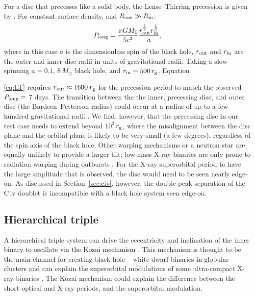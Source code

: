 \documentclass[a4paper,fleqn,usenatbib]{mnras}
\begin{document}
For a disc that precesses like a solid body, the Lense--Thirring precession is given by \citet[their Equation 43]{2007ApJ...668..417F}. For constant surface density, and $R_{\rm out} \gg R_{\rm in}$:
\begin{equation}
\label{eq:LT}
P_{\rm long} = \frac{\pi G M_1}{5 c^3} \frac{r_{\rm out}^{\frac{5}{2}} r_{\rm in}^{\frac{1}{2}}}{a},
\end{equation}
where in this case $a$ is the dimensionless spin of the black hole, $r_{\rm out}$ and $r_{\rm in}$ are the outer and inner disc radii in units of gravitational radii. Taking a slow-spinning $a=0.1$, $8\,M_\odot$ black hole, and $r_{\rm in} = 500\,r_{\rm g}$, Equation~{\ref{eq:LT} requires $r_{\rm out} \approx 1600$\,$r_{\rm g}$ for the precession period to match the observed $P_{\rm long}=$ 7 days. The transition between the the inner, precessing disc, and outer disc (the Bardeen--Petterson radius) could occur at a radius of up to a few hundred gravitational radii \citep{1975ApJ...195L..65B, 2000MNRAS.315..570N, 2001ApJ...553..955F}. We find, however, that the precessing disc in our test case needs to extend beyond $10^3$\,$r_{\rm g}$, where the misalignment between the disc plane and the orbital plane is likely to be very small (a few degrees), regardless of the spin axis of the black hole. Other warping mechanisms or a neutron star are equally unlikely to provide a larger tilt; low-mass X-ray binaries are only prone to radiation warping during outbursts \citep{2001MNRAS.320..485O}. For the X-ray superorbital period to have the large amplitude that is observed, the disc would need to be seen nearly edge-on. As discussed in Section~\ref{sec:civ}, however, the double-peak separation of the C\,{\sc iv} doublet is incompatible with a black hole system seen edge-on.

\subsection{Hierarchical triple}

A hierarchical triple system can drive the eccentricity and inclination of the inner binary to oscillate via the Kozai mechanism \citep{1962AJ.....67..591K}. This mechanism is thought to be the main channel for creating black hole -- white dwarf binaries in globular clusters \citep{2010ApJ...717..948I} and can explain the superorbital modulations of some ultra-compact X-ray binaries \citep{2007MNRAS.377.1006Z, 2010MNRAS.409L..84M}. The Kozai mechanism could explain the difference between the short optical and X-ray periods, and the superorbital modulation. 

}
\end{document}
